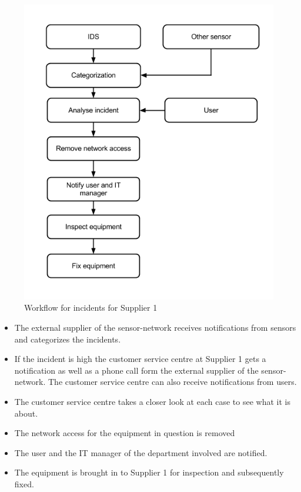 \begin{figure}[H]
\begin{center}
\includegraphics[scale=0.54]{WorkflowCaseBSupplier1.png}
\caption[Workflow for incidents, Case B Supplier 1]{Workflow for incidents for Supplier 1}
\label{fig:WorkflowCaseBSupplier1}
\end{center}
\end{figure}

\begin{itemize}
\item The external supplier of the sensor-network receives notifications from sensors and categorizes the incidents.
\item If the incident is high the customer service centre at Supplier 1 gets a notification as well as a phone call form the external supplier of the sensor-network. The customer service centre can also receive notifications from users.
\item The customer service centre takes a closer look at each case to see what it is about.
\item The network access for the equipment in question is removed 
\item The user and the IT manager of the department involved are notified.
\item The equipment is brought in to Supplier 1 for inspection and subsequently fixed.
\end{itemize}

